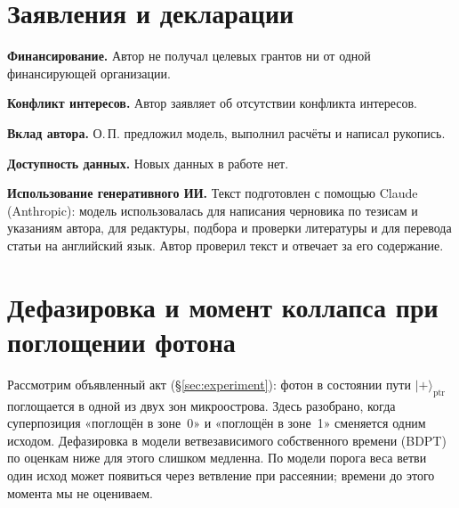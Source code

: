 \documentclass[11pt,a4paper]{article}
\newcommand{\Sref}[1]{\hyperref[#1]{\S\ref{#1}}}
\begin{document}
\section*{Заявления и декларации}

\noindent\textbf{Финансирование.} Автор не получал целевых грантов ни от одной финансирующей организации.

\noindent\textbf{Конфликт интересов.} Автор заявляет об отсутствии конфликта интересов.

\noindent\textbf{Вклад автора.} О.\,П. предложил модель, выполнил расчёты и написал рукопись.

\noindent\textbf{Доступность данных.} Новых данных в работе нет.

\noindent\textbf{Использование генеративного ИИ.} Текст подготовлен с помощью Claude (Anthropic): модель использовалась для написания черновика по тезисам и указаниям автора, для редактуры, подбора и проверки литературы и для перевода статьи на английский язык. Автор проверил текст и отвечает за его содержание.




\clearpage
\appendix
\renewcommand{\thesection}{\Alph{section}}
\section{Дефазировка и момент коллапса при поглощении фотона}\label{app:bdpt}

Рассмотрим объявленный акт (\Sref{sec:experiment}): фотон в состоянии пути $|{+}\rangle_{\mathrm{ptr}}$ поглощается в одной из двух зон микроострова. Здесь разобрано, когда суперпозиция «поглощён в зоне~0» и «поглощён в зоне~1» сменяется одним исходом. Дефазировка в модели ветвезависимого собственного времени (BDPT)~\cite{ponfilenok2026branch} по оценкам ниже для этого слишком медленна. По модели порога веса ветви~\cite{ponfilenok2026threshold} один исход может появиться через ветвление при рассеянии; времени до этого момента мы не оцениваем.
\end{document}
